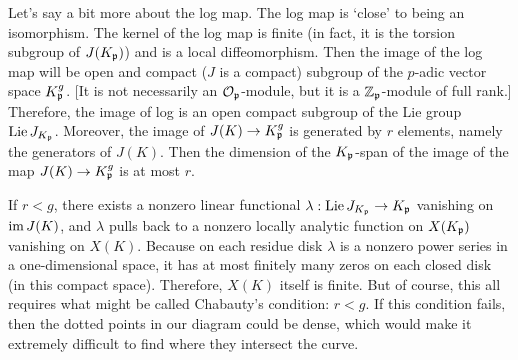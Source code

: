 Let's say a bit more about the log map. The log map is `close' to being an isomorphism. The kernel of the log map is finite (in fact, it is the torsion subgroup of $J(K_{\mathfrak{p}})$) and is a local diffeomorphism. Then the image of the log map will be open and compact ($J$ is a compact) subgroup of the $p$-adic vector space $K_{\mathfrak{p}}^g$. [It is not necessarily an $\mathcal{O}_{\mathfrak{p}}$-module, but it is a $\mathbb{Z}_{\mathfrak{p}}$-module of full rank.] Therefore, the image of log is an open compact subgroup of the Lie group $\operatorname{Lie} J_{K_{\mathfrak{p}}}$. Moreover, the image of $J(K) \to K_{\mathfrak{p}}^g$ is generated by $r$ elements, namely the generators of $J(K)$. Then the dimension of the $K_{\mathfrak{p}}$-span of the image of the map $J(K) \to K_{\mathfrak{p}}^g$ is at most $r$.


If $r< g$, there exists a nonzero linear functional $\lambda: \operatorname{Lie} J_{K_{\mathfrak{p}}} \to K_{\mathfrak{p}}$ vanishing on $\operatorname{im} J(K)$, and $\lambda$ pulls back to a nonzero locally analytic function on $X(K_{\mathfrak{p}})$ vanishing on $X(K)$. Because on each residue disk $\lambda$ is a nonzero power series in a one-dimensional space, it has at most finitely many zeros on each closed disk (in this compact space). Therefore, $X(K)$ itself is finite. But of course, this all requires what might be called Chabauty's condition: $r<g$. If this condition fails, then the dotted points in our diagram could be dense, which would make it extremely difficult to find where they intersect the curve. 


